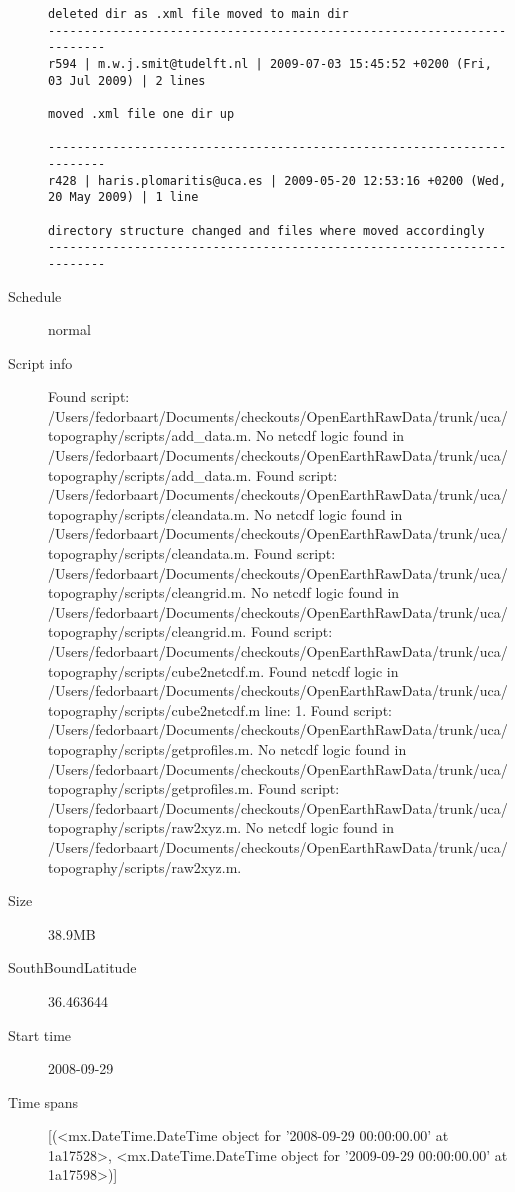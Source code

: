 \documentclass[9]{report}
\begin{document}
\begin{description}
\begin{verbatim}
deleted dir as .xml file moved to main dir
------------------------------------------------------------------------
r594 | m.w.j.smit@tudelft.nl | 2009-07-03 15:45:52 +0200 (Fri, 03 Jul 2009) | 2 lines

moved .xml file one dir up

------------------------------------------------------------------------
r428 | haris.plomaritis@uca.es | 2009-05-20 12:53:16 +0200 (Wed, 20 May 2009) | 1 line

directory structure changed and files where moved accordingly 
------------------------------------------------------------------------

\end{verbatim}
  \item[Schedule] normal
  \item[Script info] Found script: /Users/fedorbaart/Documents/checkouts/OpenEarthRawData/trunk/uca/topography/scripts/add\_data.m.
No netcdf logic found in /Users/fedorbaart/Documents/checkouts/OpenEarthRawData/trunk/uca/topography/scripts/add\_data.m.
Found script: /Users/fedorbaart/Documents/checkouts/OpenEarthRawData/trunk/uca/topography/scripts/cleandata.m.
No netcdf logic found in /Users/fedorbaart/Documents/checkouts/OpenEarthRawData/trunk/uca/topography/scripts/cleandata.m.
Found script: /Users/fedorbaart/Documents/checkouts/OpenEarthRawData/trunk/uca/topography/scripts/cleangrid.m.
No netcdf logic found in /Users/fedorbaart/Documents/checkouts/OpenEarthRawData/trunk/uca/topography/scripts/cleangrid.m.
Found script: /Users/fedorbaart/Documents/checkouts/OpenEarthRawData/trunk/uca/topography/scripts/cube2netcdf.m.
Found netcdf logic in /Users/fedorbaart/Documents/checkouts/OpenEarthRawData/trunk/uca/topography/scripts/cube2netcdf.m line: 1.
Found script: /Users/fedorbaart/Documents/checkouts/OpenEarthRawData/trunk/uca/topography/scripts/getprofiles.m.
No netcdf logic found in /Users/fedorbaart/Documents/checkouts/OpenEarthRawData/trunk/uca/topography/scripts/getprofiles.m.
Found script: /Users/fedorbaart/Documents/checkouts/OpenEarthRawData/trunk/uca/topography/scripts/raw2xyz.m.
No netcdf logic found in /Users/fedorbaart/Documents/checkouts/OpenEarthRawData/trunk/uca/topography/scripts/raw2xyz.m.
  \item[Size] 38.9MB
  \item[SouthBoundLatitude] 36.463644
  \item[Start time] 2008-09-29
  \item[Time spans] [(<mx.DateTime.DateTime object for '2008-09-29 00:00:00.00' at 1a17528>, <mx.DateTime.DateTime object for '2009-09-29 00:00:00.00' at 1a17598>)]

\end{description}
\end{document}
